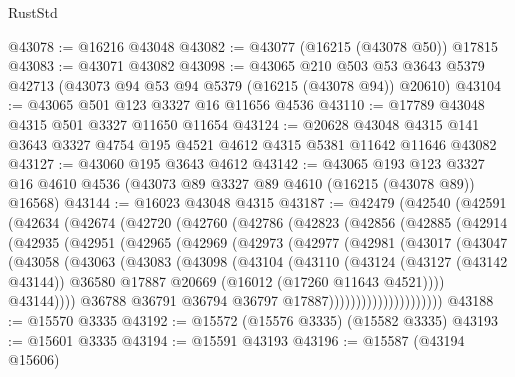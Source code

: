 \begin{lexlean}{RustStd}
\begin{coremodule}
@43078 := @16216 @43048
@43082 := @43077 (@16215 (@43078 @50)) @17815
@43083 := @43071 @43082
@43098 := @43065
    @210
    @503
    @53
    @3643
    @5379
    @42713
    (@43073 @94 @53 @94 @5379 (@16215 (@43078 @94)) @20610)
@43104 := @43065 @501 @123 @3327 @16 @11656 @4536
@43110 := @17789 @43048 @4315 @501 @3327 @11650 @11654
@43124 := @20628
    @43048
    @4315
    @141
    @3643
    @3327
    @4754
    @195
    @4521
    @4612
    @4315
    @5381
    @11642
    @11646
    @43082
@43127 := @43060 @195 @3643 @4612
@43142 := @43065
    @193
    @123
    @3327
    @16
    @4610
    @4536
    (@43073 @89 @3327 @89 @4610 (@16215 (@43078 @89)) @16568)
@43144 := @16023 @43048 @4315
@43187 := @42479
    (@42540
      (@42591
        (@42634
          (@42674
            (@42720
              (@42760
                (@42786
                  (@42823
                    (@42856
                      (@42885
                        (@42914
                          (@42935
                            (@42951
                              (@42965
                                (@42969
                                  (@42973
                                    (@42977
                                      (@42981
                                        (@43017
                                          (@43047
                                            (@43058
                                              (@43063
                                                (@43083
                                                  (@43098
                                                    (@43104
                                                      (@43110
                                                        (@43124
                                                          (@43127 (@43142 @43144))
                                                          @36580
                                                          @17887
                                                          @20669
                                                          (@16012 (@17260 @11643 @4521))))
                                                      @43144))))
                                              @36788
                                              @36791
                                              @36794
                                              @36797
                                              @17887)))))))))))))))))))))
@43188 := @15570 @3335
@43192 := @15572 (@15576 @3335) (@15582 @3335)
@43193 := @15601 @3335
@43194 := @15591 @43193
@43196 := @15587 (@43194 @15606)

\end{coremodule}
\end{lexlean}
